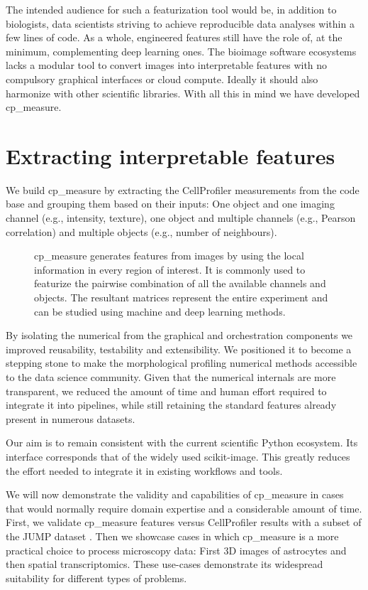 \documentclass{article}
\begin{document}
The intended audience for such a featurization tool would be, in addition to biologists, data scientists striving to achieve reproducible data analyses within a few lines of code. As a whole, engineered features still have the role of, at the minimum, complementing deep learning ones. The bioimage software ecosystems lacks a modular tool to convert images into interpretable features with no compulsory graphical interfaces or cloud compute. Ideally it should also harmonize with other scientific libraries. With all this in mind we have developed cp\_measure.
\section{Extracting interpretable features}
\label{sec:org61842b5}
We build cp\_measure by extracting the CellProfiler measurements from the code base and grouping them based on their inputs: One object and one imaging channel (e.g., intensity, texture), one object and multiple channels (e.g., Pearson correlation) and multiple objects (e.g., number of neighbours).

\begin{figure}[htbp]
\centering

\caption{\label{fig:overview}cp\_measure generates features from images by using the local information in every region of interest. It is commonly used to featurize the pairwise combination of all the available channels and objects. The resultant matrices represent the entire experiment and can be studied using machine and deep learning methods.}
\end{figure}

By isolating the numerical from the graphical and orchestration components we improved reusability, testability and extensibility. We positioned it to become a stepping stone to make the morphological profiling numerical methods accessible to the data science community. Given that the numerical internals are more transparent, we reduced the amount of time and human effort required to integrate it into pipelines, while still retaining the standard features already present in numerous datasets.

Our aim is to remain consistent with the current scientific Python ecosystem. Its interface corresponds that of the widely used scikit-image. This greatly reduces the effort needed to integrate it in existing workflows and tools.

We will now demonstrate the validity and capabilities of cp\_measure in cases that would normally require domain expertise and a considerable amount of time. First, we validate cp\_measure features versus CellProfiler results with a subset of the JUMP dataset \citep{chandrasekaranJUMPCellPainting2023}. Then we showcase cases in which cp\_measure is a more practical choice to process microscopy data: First 3D images of astrocytes and then spatial transcriptomics. These use-cases demonstrate its widespread suitability for different types of problems. 
\end{document}
